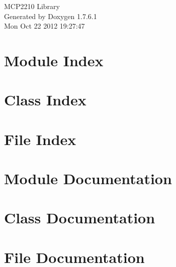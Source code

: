 \documentclass[a4paper]{book}
\begin{document}
\hypersetup{pageanchor=false,citecolor=blue}
\begin{titlepage}
\vspace*{7cm}
\begin{center}
{\Large \-M\-C\-P2210 \-Library }\\
\vspace*{1cm}
{\large \-Generated by Doxygen 1.7.6.1}\\
\vspace*{0.5cm}
{\small Mon Oct 22 2012 19:27:47}\\
\end{center}
\end{titlepage}
\clearemptydoublepage
{}
\tableofcontents
\clearemptydoublepage
{}
\hypersetup{pageanchor=true,citecolor=blue}
\chapter{\-Module \-Index}

\chapter{\-Class \-Index}

\chapter{\-File \-Index}

\chapter{\-Module \-Documentation}

\chapter{\-Class \-Documentation}











\chapter{\-File \-Documentation}






\printindex
\end{document}
